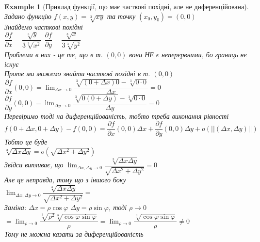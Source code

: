 \documentclass[a4paper, 14pt]{extarticle}
\def\huge{\displaystyle}
\def\bigline{\vspace{5mm}\\}
\theoremstyle{theoremdd}
\theoremstyle{theoremdd}
\theoremstyle{theoremdd}
\theoremstyle{theoremdd}
\newtheorem{example}[theorem]{Example}
\theoremstyle{theoremdd}
\theoremstyle{theoremdd}
\theoremstyle{theoremdd}
\theoremstyle{theoremdd}
\def\departial#1#2{\dfrac{\partial {#1}}{\partial {#2}}}
\begin{document}
\begin{example}[Приклад функції, що має часткові похідні, але не диференційована]
Задано функцію $f(x,y) = \sqrt[3]{xy}$ та точку $(x_0,y_0) = (0,0)$\\
Знайдемо часткові похідні\\
$\departial{f}{x} = \dfrac{\sqrt[3]{y}}{3 \sqrt[3]{x^2}}$ \hspace{2cm} $\departial{f}{y} = \dfrac{\sqrt[3]{x}}{3 \sqrt[3]{y^2}}$\\
Проблема в них - це те, що в т. $(0,0)$ вони НЕ є неперервними, бо границь не існує\\
Проте ми можемо знайти часткові похідні в т. $(0,0)$\\
$\departial{f}{x}(0,0) = \huge\lim_{\Delta x \to 0} \dfrac{\sqrt[3]{(0+\Delta x) 0} - \sqrt[3]{0 \cdot 0}}{\Delta x} = 0$\\
$\departial{f}{y}(0,0) = \huge\lim_{\Delta y \to 0} \dfrac{\sqrt[3]{0(0 + \Delta y)} - \sqrt[3]{0 \cdot 0}}{\Delta y} = 0$
\bigline
Перевіримо тоді на диференційованість, тобто треба виконання рівності\\
$f(0+\Delta x, 0 + \Delta y) - f(0,0) = \departial{f}{x}(0,0) \Delta x + \departial{f}{y}(0,0)\Delta y + o(||(\Delta x, \Delta y)||)$\\
Тобто це буде\\
$\sqrt[3]{\Delta x \Delta y} = o(\sqrt{\Delta x^2 + \Delta y^2})$\\
Звідси випливає, що $\huge\lim_{\Delta x, \Delta y \to 0} \dfrac{\sqrt[3]{\Delta x \Delta y}}{\sqrt{\Delta x^2 + \Delta y^2}} = 0$\\
Але це неправда, тому що з іншого боку\\
$\huge\lim_{\Delta x, \Delta y \to 0} \dfrac{\sqrt[3]{\Delta x \Delta y}}{\sqrt{\Delta x^2 + \Delta y^2}} \boxed{=}$\\
Заміна: $\Delta x = \rho \cos \varphi$ \hspace{0.5cm} $\Delta y = \rho \sin \varphi$, тоді $\rho \to 0$\\
$\boxed{=} \huge\lim_{\rho \to 0} \dfrac{\sqrt[3]{\rho^2} \sqrt[3]{\cos \varphi \sin \varphi}}{\rho} = \lim_{\rho \to 0} \dfrac{\sqrt[3]{\cos \varphi \sin \varphi}}{\rho} \neq 0$\\
Тому не можна казати за диференційованість
\bigline
\end{example}
\end{document}
